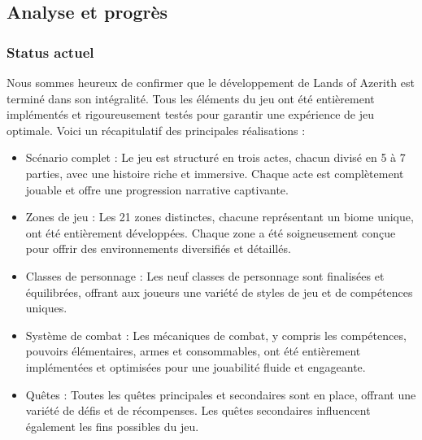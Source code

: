 \subsection{Analyse et progrès}

\subsubsection*{Status actuel}


Nous sommes heureux de confirmer que le développement de Lands of Azerith est terminé dans son intégralité. Tous les éléments du jeu ont été entièrement implémentés et rigoureusement testés pour garantir une expérience de jeu optimale. Voici un récapitulatif des principales réalisations :
\\

\begin{itemize}

    \item Scénario complet : Le jeu est structuré en trois actes, chacun divisé en 5 à 7 parties, avec une histoire riche et immersive. Chaque acte est complètement jouable et offre une progression narrative captivante.
    \\

    \item Zones de jeu : Les 21 zones distinctes, chacune représentant un biome unique, ont été entièrement développées. Chaque zone a été soigneusement conçue pour offrir des environnements diversifiés et détaillés.
    \\

    \item Classes de personnage : Les neuf classes de personnage sont finalisées et équilibrées, offrant aux joueurs une variété de styles de jeu et de compétences uniques.
    \\

    \item Système de combat : Les mécaniques de combat, y compris les compétences, pouvoirs élémentaires, armes et consommables, ont été entièrement implémentées et optimisées pour une jouabilité fluide et   engageante.
    \\

    \item Quêtes : Toutes les quêtes principales et secondaires sont en place, offrant une variété de défis et de récompenses. Les quêtes secondaires influencent également les fins possibles du jeu.
    \\


\end{itemize}
